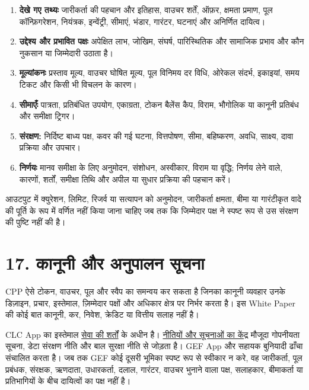 \documentclass[11pt]{article}
\begin{document}
\begin{enumerate}[leftmargin=*]
\item \textbf{देखे गए तथ्यः} जारीकर्ता की पहचान और इतिहास, वाउचर शर्तें, ऑफ़र, क्षमता प्रमाण, पूल कॉन्फ़िगरेशन, नियंत्रक, इन्वेंट्री, सीमाएं, भंडार, गारंटर, घटनाएं और अनिर्णित दायित्व।
\item \textbf{उद्देश्य और प्रभावित पक्षः} अपेक्षित लाभ, जोखिम, संघर्ष, पारिस्थितिक और सामाजिक प्रभाव और कौन नुकसान या जिम्मेदारी उठाता है।
\item \textbf{मूल्यांकनः} प्रस्ताव मूल्य, वाउचर घोषित मूल्य, पूल विनिमय दर विधि, ओरेकल संदर्भ, इकाइयां, समय टिकट और किसी भी विचलन के कारण।
\item \textbf{सीमाएँः} पात्रता, प्रतिबंधित उपयोग, एकाग्रता, टोकन बैलेंस कैप, विराम, भौगोलिक या कानूनी प्रतिबंध और समीक्षा ट्रिगर।
\item \textbf{संरक्षण:} निर्दिष्ट बाध्य पक्ष, कवर की गई घटना, वित्तपोषण, सीमा, बहिष्करण, अवधि, साक्ष्य, दावा प्रक्रिया और उपचार।
\item \textbf{निर्णयः} मानव समीक्षा के लिए अनुमोदन, संशोधन, अस्वीकार, विराम या वृद्धि; निर्णय लेने वाले, कारणों, शर्तों, समीक्षा तिथि और अपील या सुधार प्रक्रिया की पहचान करें।
\end{enumerate}
आउटपुट में क्युरेशन, लिमिट, रिजर्व या सत्यापन को अनुमोदन, जारीकर्ता क्षमता, बीमा या गारंटीकृत वादे की पूर्ति के रूप में वर्णित नहीं किया जाना चाहिए जब तक कि जिम्मेदार पक्ष ने स्पष्ट रूप से उस संरक्षण की पुष्टि नहीं की है।


\section*{17. कानूनी और अनुपालन सूचना}

CPP ऐसे टोकन, वाउचर, पूल और स्वैप का समन्वय कर सकता है जिनका कानूनी व्यवहार उनके डिज़ाइन, प्रचार, इस्तेमाल, ज़िम्मेदार पक्षों और अधिकार क्षेत्र पर निर्भर करता है। इस White Paper की कोई बात कानूनी, कर, निवेश, क्रेडिट या वित्तीय सलाह नहीं है।

CLC App का इस्तेमाल \href{https://docs.cosmolocal.credit/hi/governance/terms}{सेवा की शर्तों} के अधीन है। \href{https://docs.cosmolocal.credit/hi/governance/policies}{नीतियों और सूचनाओं का केंद्र} मौजूदा गोपनीयता सूचना, डेटा संरक्षण नीति और बाल सुरक्षा नीति से जोड़ता है। GEF App और सहायक बुनियादी ढाँचा संचालित करता है। जब तक GEF कोई दूसरी भूमिका स्पष्ट रूप से स्वीकार न करे, वह जारीकर्ता, पूल प्रबंधक, संरक्षक, ऋणदाता, उधारकर्ता, दलाल, गारंटर, वाउचर भुनाने वाला पक्ष, सलाहकार, बीमाकर्ता या प्रतिभागियों के बीच दायित्वों का पक्ष नहीं है।
\end{document}
